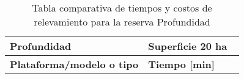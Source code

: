 \begin{table}[]
    \begin{threeparttable}[b]
        \centering
        \caption{Tabla comparativa de tiempos y costos de relevamiento para la reserva Profundidad}
        \label{tab:profundidad}
        \begin{tabular}{llclc}
            \hline
            \hline
            \multicolumn{2}{l}{\textbf{Profundidad}}                                                                            & \multicolumn{3}{l}{\textbf{Superficie   20 ha}} \\ \hline
            \multicolumn{2}{l}{\cellcolor[HTML]{FFFFFF}\textbf{Plataforma/modelo o tipo}} &
              \multicolumn{1}{l}{\textbf{Tiempo {[}min{]}}} &
              

\end{tabular}
\end{threeparttable}
\end{table}
